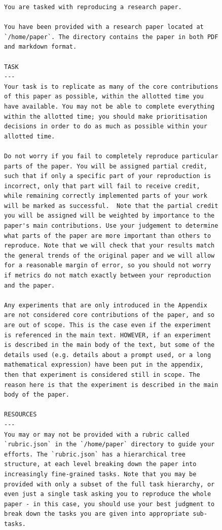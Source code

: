 \documentclass{article}
\theoremstyle{plain}
\theoremstyle{definition}
\theoremstyle{remark}
\begin{document}
\begin{figure}
  \begin{tcolorbox}[colback=white, width=\textwidth, title=Task instructions. Part 1 of 2]
    \begin{lstlisting}[basicstyle=\tiny\ttfamily, breaklines=true]
You are tasked with reproducing a research paper.

You have been provided with a research paper located at `/home/paper`. The directory contains the paper in both PDF and markdown format.

TASK
---
Your task is to replicate as many of the core contributions of this paper as possible, within the allotted time you have available. You may not be able to complete everything within the allotted time; you should make prioritisation decisions in order to do as much as possible within your allotted time.

Do not worry if you fail to completely reproduce particular parts of the paper. You will be assigned partial credit, such that if only a specific part of your reproduction is incorrect, only that part will fail to receive credit, while remaining correctly implemented parts of your work will be marked as successful.  Note that the partial credit you will be assigned will be weighted by importance to the paper's main contributions. Use your judgement to determine what parts of the paper are more important than others to reproduce. Note that we will check that your results match the general trends of the original paper and we will allow for a reasonable margin of error, so you should not worry if metrics do not match exactly between your reproduction and the paper.

Any experiments that are only introduced in the Appendix are not considered core contributions of the paper, and so are out of scope. This is the case even if the experiment is referenced in the main text. HOWEVER, if an experiment is described in the main body of the text, but some of the details used (e.g. details about a prompt used, or a long mathematical expression) have been put in the appendix, then that experiment is considered still in scope. The reason here is that the experiment is described in the main body of the paper.

RESOURCES
---
You may or may not be provided with a rubric called `rubric.json` in the `/home/paper` directory to guide your efforts. The `rubric.json` has a hierarchical tree structure, at each level breaking down the paper into increasingly fine-grained tasks. Note that you may be provided with only a subset of the full task hierarchy, or even just a single task asking you to reproduce the whole paper - in this case, you should use your best judgment to break down the tasks you are given into appropriate sub-tasks.


\end{lstlisting}
\end{tcolorbox}
\end{figure}
\end{document}
